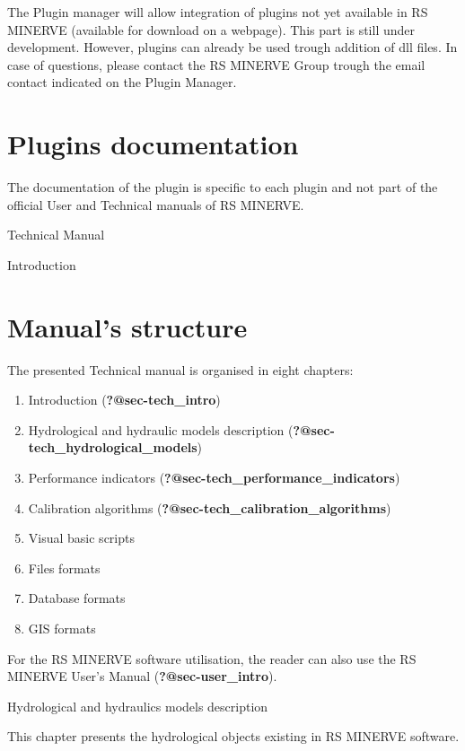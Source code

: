 \documentclass[
  letterpaper,
  DIV=11,
  numbers=noendperiod]{scrreprt}
\begin{document}
The Plugin manager will allow integration of plugins not yet available
in RS MINERVE (available for download on a webpage). This part is still
under development. However, plugins can already be used trough addition
of dll files. In case of questions, please contact the RS MINERVE Group
trough the email contact indicated on the Plugin Manager.

\hypertarget{plugins-documentation}{%
\chapter{Plugins documentation}\label{plugins-documentation}}

The documentation of the plugin is specific to each plugin and not part
of the official User and Technical manuals of RS MINERVE.

Technical Manual

Introduction

\hypertarget{manuals-structure}{%
\chapter*{Manual's structure}\label{manuals-structure}}

The presented Technical manual is organised in eight chapters:

\begin{enumerate}
\def\labelenumi{\arabic{enumi}.}
\item
  Introduction (\textbf{?@sec-tech\_intro})
\item
  Hydrological and hydraulic models description
  (\textbf{?@sec-tech\_hydrological\_models})
\item
  Performance indicators (\textbf{?@sec-tech\_performance\_indicators})
\item
  Calibration algorithms (\textbf{?@sec-tech\_calibration\_algorithms})
\item
  Visual basic scripts
\item
  Files formats
\item
  Database formats
\item
  GIS formats
\end{enumerate}

For the RS MINERVE software utilisation, the reader can also use the RS
MINERVE User's Manual (\textbf{?@sec-user\_intro}).

Hydrological and hydraulics models description

This chapter presents the hydrological objects existing in RS MINERVE
software.
\end{document}
